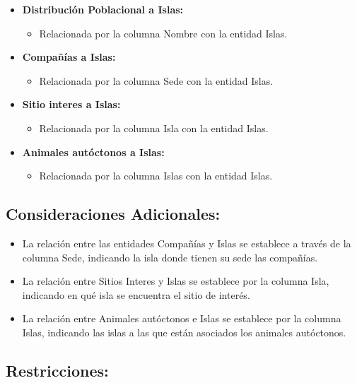 \documentclass[11pt]{report}
\begin{document}
\begin{itemize}
    \item \textbf{Distribución Poblacional a Islas:}
    \begin{itemize}
        \item Relacionada por la columna Nombre con la entidad Islas.
    \end{itemize}
    
    \item \textbf{Compañías a Islas:}
    \begin{itemize}
        \item Relacionada por la columna Sede con la entidad Islas.
    \end{itemize}
    
    \item \textbf{Sitio interes a Islas:}
    \begin{itemize}
        \item Relacionada por la columna Isla con la entidad Islas.
    \end{itemize}
    
    \item \textbf{Animales autóctonos a Islas:}
    \begin{itemize}
        \item Relacionada por la columna Islas con la entidad Islas.
    \end{itemize}
\end{itemize}

\subsection{Consideraciones Adicionales:}

\begin{itemize}
    \item La relación entre las entidades Compañías y Islas se establece a través de la columna Sede, indicando la isla donde tienen su sede las compañías.
    \item La relación entre Sitios Interes y Islas se establece por la columna Isla, indicando en qué isla se encuentra el sitio de interés.
    \item La relación entre Animales autóctonos e Islas se establece por la columna Islas, indicando las islas a las que están asociados los animales autóctonos.
\end{itemize}

\subsection{Restricciones:}
\end{document}
